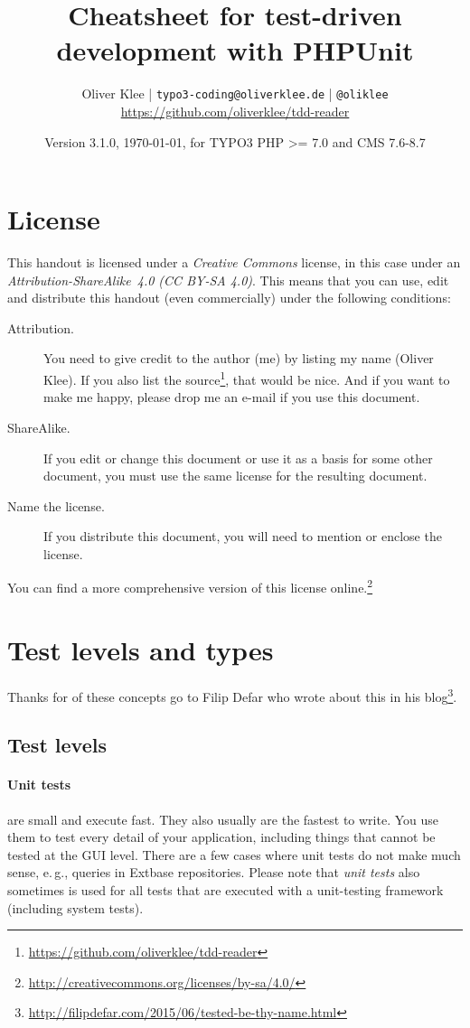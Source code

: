 \documentclass[a4paper,11pt,headsepline]{scrartcl}
\author{
  Oliver Klee | \texttt{typo3-coding@oliverklee.de} | \texttt{@oliklee} \\
  \url{https://github.com/oliverklee/tdd-reader}
}
\date{Version 3.1.0, \today, for TYPO3 PHP >= 7.0 and CMS 7.6-8.7}
\title{
  Cheatsheet for test-driven development with PHPUnit
}
\begin{document}
\nocite*{}

\maketitle

\section*{License}

This handout is licensed under a \emph{Creative Commons} license, in this case under an \emph{Attribution-ShareAlike~4.0 (CC BY-SA 4.0)}. This means that you can use, edit and distribute this handout (even commercially) under the following conditions:

\begin{description}
  \item[Attribution.] You need to give credit to the author (me) by listing my name (Oliver Klee). If you also list the source\footnote{\url{https://github.com/oliverklee/tdd-reader}}, that would be nice. And if you want to make me happy, please drop me an e-mail if you use this document.
  \item[ShareAlike.] If you edit or change this document or use it as a basis for some other document, you must use the same license for the resulting document.
  \item[Name the license.] If you distribute this document, you will need to mention or enclose the license.
\end{description}

You can find a more comprehensive version of this license online.\footnote{\url{http://creativecommons.org/licenses/by-sa/4.0/}}


\pagebreak
\tableofcontents

\pagebreak
\section{Test levels and types}

Thanks for of these concepts go to Filip Defar who wrote about this in his blog\footnote{\url{http://filipdefar.com/2015/06/tested-be-thy-name.html}}.


\subsection{Test levels}

\paragraph{Unit tests} are small and execute fast. They also usually are the fastest to write. You use them to test every detail of your application, including things that cannot be tested at the GUI level. There are a few cases where unit tests do not make much sense, e.\,g., queries in Extbase repositories. Please note that \emph{unit tests} also sometimes is used for all tests that are executed with a unit-testing framework (including system tests).
\end{document}
